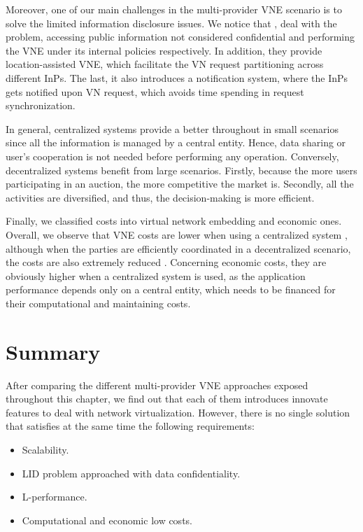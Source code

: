 Moreover, one of our main challenges in the multi-provider VNE scenario is to solve the limited information disclosure issues. We notice that \citep{dietrich2015multi}, \citep{chowdhury2010polyvine} deal with the problem, accessing public information not considered confidential and performing the VNE under its internal policies respectively. In addition, they provide location-assisted VNE, which facilitate the VN request partitioning across different InPs. The last, it also introduces a notification system, where the InPs gets notified upon VN request, which avoids time spending in request synchronization. 

In general, centralized systems provide a better throughout in small scenarios since all the information is managed by a central entity. Hence, data sharing or user's cooperation is not needed before performing any operation. Conversely, decentralized systems benefit from large scenarios. Firstly, because the more users participating in an auction, the more competitive the market is. Secondly, all the activities are diversified, and thus, the decision-making is more efficient. 

Finally, we classified costs into virtual network embedding and economic ones. Overall, we observe that VNE costs are lower when using a centralized system \citep{dietrich2015multi}, although when the parties are efficiently coordinated in a decentralized scenario, the costs are also extremely reduced \citep{chowdhury2010polyvine}. Concerning economic costs, they are obviously higher when a centralized system is used, as the application performance depends only on a central entity, which needs to be financed for their computational and maintaining costs.

\section{Summary}

After comparing the different multi-provider VNE approaches exposed throughout this chapter, we find out that each of them introduces innovate features to deal with network virtualization. However, there is no single solution that satisfies at the same time the following requirements:

\begin{itemize}
	\item Scalability.
	\item LID problem approached with data confidentiality.
	\item L-performance.
	\item Computational and economic low costs.
\end{itemize}

